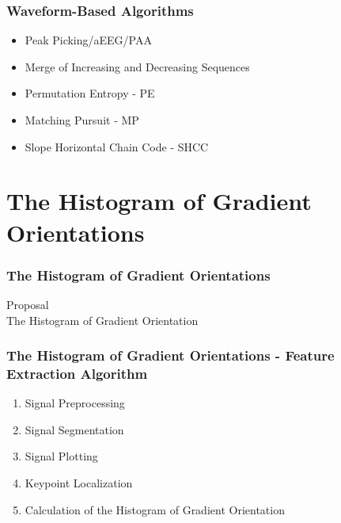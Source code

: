 \documentclass[aspectratio=169]{beamer}
\newcommand\Fontre{\fontsize{16}{16.2}\selectfont}
\begin{document}
\begin{frame}
\frametitle{Waveform-Based Algorithms}
\begin{center}
\begin{itemize}
 \item<1-> \Fontre Peak Picking/aEEG/PAA
 \item<2-> \Fontre Merge of Increasing and Decreasing Sequences
 \item<3-> \Fontre Permutation Entropy - PE
 \item<4-> \Fontre Matching Pursuit - MP
 \item<5-> \Fontre Slope Horizontal Chain Code - SHCC
\end{itemize}
\end{center}
\end{frame}


\section{The Histogram of Gradient Orientations}    
\begin{frame}
\frametitle{The Histogram of Gradient Orientations}
\begin{center}
\LARGE Proposal \\ The Histogram of Gradient Orientation
\end{center}
\end{frame}


\begin{frame}
\frametitle{The Histogram of Gradient Orientations - Feature Extraction Algorithm}
\begin{center}
\begin{enumerate}
 \item<1-> \Fontre Signal Preprocessing
 \item<2-> \Fontre Signal Segmentation
 \item<3-> \Fontre Signal Plotting
 \item<4-> \Fontre Keypoint Localization
 \item<5-> \Fontre Calculation of the Histogram of Gradient Orientation
\end{enumerate}
\end{center}
\end{frame}
\end{document}
